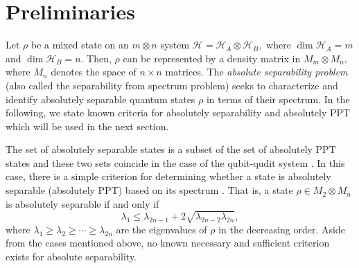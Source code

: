 \documentclass[reqno, 12pt,a4letter]{amsart}
\theoremstyle{definition}
\theoremstyle{plain}
\begin{document}
\section{Preliminaries}

Let $\rho$ be a mixed state on an $m\otimes n$ system $\mathcal{H}=\mathcal{H}_A \otimes \mathcal{H}_B,$ where $\dim \mathcal{H}_A=m$ and $\dim \mathcal{H}_B=n.$ Then, $\rho$ can be represented by a density matrix in $M_m\otimes M_n,$ where $M_n$ denotes the space of $n \times n$  matrices.  The {\em absolute separability problem} \cite{Kus2001, Hildebrand2007,Johnston2013, Arunachalam2015} (also called the separability from spectrum problem)  seeks to characterize and identify absolutely separable quantum states $\rho$   in terms of their spectrum. In the following, we state known criteria for absolutely separability and absolutely PPT  which will be used in the next section.    

The set of absolutely separable states is a subset of the set of absolutely PPT states and these two sets coincide in the case of the qubit-qudit system \cite{Johnston2013}. In this case, there is a simple criterion for determining whether a state is absolutely separable (absolutely PPT) based on its spectrum \cite{Hildebrand2007,Johnston2013, Arunachalam2015}. That is,  a state $\rho \in M_2 \otimes M_n$ is absolutely separable if and only if 
\begin{equation}\label{Eq2}
	\lambda_1 \leq \lambda_{2n-1} + 2\sqrt{\lambda_{2n-2}\lambda_{2n}},
\end{equation}
where $\lambda_1 \ge \lambda_2 \ge \cdots \ge \lambda_{2n}$ are the eigenvalues of $\rho$ in the decreasing order. 
Aside from the cases mentioned above, no known necessary and sufficient criterion exists for absolute separability.
\end{document}
